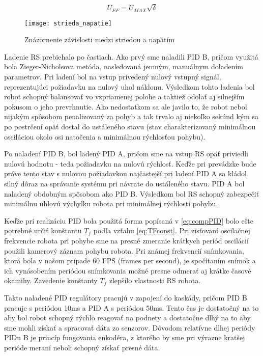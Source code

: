 \begin{equation}
U_{EF} = U_{MAX}\sqrt{\delta}
\label{eq:RMSSquare}
\end{equation}

\begin{figure}[b]
\centering
\texttt{[image: strieda\_napatie]}
\caption{Znázornenie závislosti medzi striedou a napätím}
\label{fig:strieda_napatie}
\end{figure}

Ladenie \ac{RS} prebiehalo po častiach. Ako prvý sme naladili PID B, pričom využitá bola Zieger-Nicholsova metóda, nasledovaná jemným, manuálnym doladením parametrov. Pri ladení bol na vstup privedený nulový vstupný signál, reprezentujúci požiadavku na nulový uhol náklonu. Výsledkom tohto ladenia bol robot schopný balansovať vo vzpriamenej polohe a taktiež odolať aj silnejším pokusom o jeho prevrhnutie. Ako nedostatkom sa ale javilo to, že robot nebol nijakým spôsobom penalizovaný za pohyb a tak trvalo aj niekoľko sekúnd kým sa po postrčení opäť dostal do ustáleného stavu (stav charakterizovaný minimálnou osciláciou okolo osi natočenia a minimálnou rýchlosťou pohybu).

Po naladení PID B, bol ladený PID A, pričom sme na vstup RS opäť priviedli nulovú hodnotu - teda požiadavku na nulovú rýchlosť. Keďže pri prevádzke bude práve tento stav s nulovou požiadavkou najčastejší pri ladení PID A sa kládol silný dôraz na správanie systému pri návrate do ustáleného stavu. PID A bol naladený obdobným spôsobom ako PID B. Výsledkom bol \ac{RS} schopný zabezpečiť minimálnu uhlovú výchylku robota pri minimálnej rýchlosti pohybu.

Keďže pri realizáciu PID bola použitá forma popísaná v \ref{eq:compPID} bolo ešte potrebné určiť konštantu $T_f$ podľa vzťahu \ref{eq:TFconst}. Pri zisťovaní oscilačnej frekvencie robota pri pohybe sme na presné zmeranie krátkych periód oscilácií použili kamerový záznam pohybu robota. Pri známej frekvencií snímkovania, ktorá bola v našom prípade 60 \ac{FPS} (frames per second), je spočítaním snímok a ich vynásobením periódou snímkovania možné presne odmerať aj krátke časové okamihy. Zavedenie konštanty $T_f$ zlepšilo vlastnosti \ac{RS} robota.

Takto naladené PID regulátory pracujú v zapojení do kaskády, pričom PID B pracuje s periódou 10ms a PID A s periódou 50ms. Tento čas je dostatočný na to aby bol robot schopný rýchlo reagovať na podnety a dostatočne dlhý na to aby sme mohli získať a spracovať dáta zo senzorov. Dôvodom relatívne dlhej periódy PIDu B je princíp fungovania enkodéra, z ktorého by sme pri výrazne kratšej perióde meraní neboli schopný získať presné dáta.   

